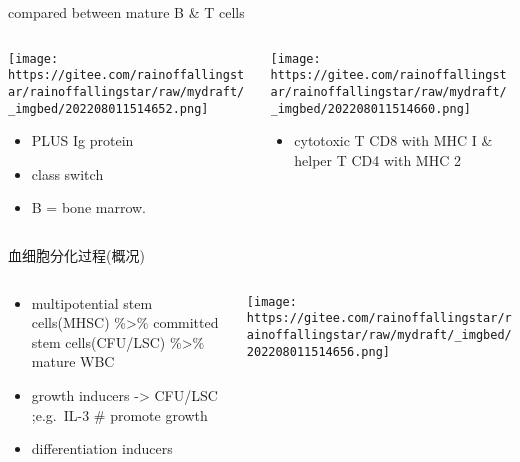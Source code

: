 \documentclass[
  ignorenonframetext,
]{beamer}
\providecommand{\tightlist}{%
  \setlength{\itemsep}{0pt}\setlength{\parskip}{0pt}}
\begin{document}
\begin{frame}
\begin{block}{compared between mature B \& T cells}
\protect\hypertarget{compared-between-mature-b-t-cells}{}
\begin{columns}[T]
\begin{column}{0.5\textwidth}
\texttt{[image: https://gitee.com/rainoffallingstar/rainoffallingstar/raw/mydraft/\_imgbed/202208011514652.png]}

\begin{itemize}
\item
  PLUS Ig protein
\item
  class switch
\item
  B = bone marrow.
\end{itemize}
\end{column}

\begin{column}{0.5\textwidth}
\texttt{[image: https://gitee.com/rainoffallingstar/rainoffallingstar/raw/mydraft/\_imgbed/202208011514660.png]}

\begin{itemize}
\tightlist
\item
  cytotoxic T CD8 with MHC I \& helper T CD4 with MHC 2
\end{itemize}
\end{column}
\end{columns}
\end{block}
\end{frame}

\begin{frame}
\begin{block}{血细胞分化过程(概况)}
\protect\hypertarget{ux8840ux7ec6ux80deux5206ux5316ux8fc7ux7a0bux6982ux51b5}{}
\begin{columns}[T]
\begin{column}{0.4\textwidth}
\begin{itemize}
\item
  multipotential stem cells(MHSC) \%\textgreater\% committed stem
  cells(CFU/LSC) \%\textgreater\% mature WBC
\item
  growth inducers -\textgreater{} CFU/LSC ;e.g.~IL-3 \# promote growth
\item
  differentiation inducers
\end{itemize}
\end{column}

\begin{column}{0.6\textwidth}
\texttt{[image: https://gitee.com/rainoffallingstar/rainoffallingstar/raw/mydraft/\_imgbed/202208011514656.png]}
\end{column}
\end{columns}
\end{block}
\end{frame}
\end{document}

